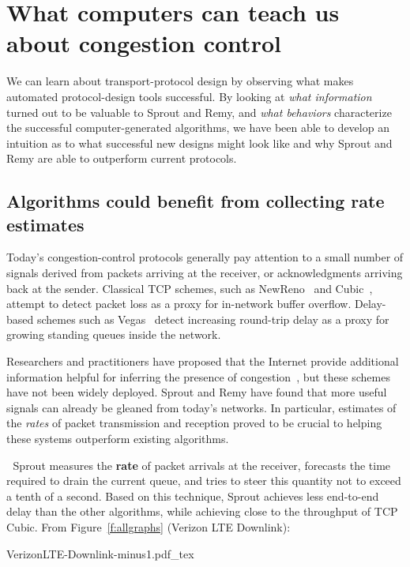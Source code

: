 \section{What computers can teach us about congestion control}

We can learn about transport-protocol design by observing what makes
automated protocol-design tools successful. By looking at \emph{what
  information} turned out to be valuable to Sprout and Remy, and
\emph{what behaviors} characterize the successful computer-generated
algorithms, we have been able to develop an intuition as to what
successful new designs might look like and why Sprout and Remy are
able to outperform current protocols.

\subsection{Algorithms could benefit from collecting rate estimates}

Today's congestion-control protocols generally pay attention to a
small number of signals derived from packets arriving at the receiver,
or acknowledgments arriving back at the sender. Classical TCP schemes,
such as NewReno~\cite{newreno} and Cubic~\cite{cubic}, attempt to
detect packet loss as a proxy for in-network buffer
overflow. Delay-based schemes such as Vegas~\cite{vegas} detect
increasing round-trip delay as a proxy for growing standing queues
inside the network.

Researchers and practitioners have proposed that the Internet provide
additional information helpful for inferring the presence of
congestion~\cite{ecn,xcp,rcp,vcp}, but these schemes have not been
widely deployed. Sprout and Remy have found that more useful signals
can already be gleaned from today's networks. In particular, estimates
of the \emph{rates} of packet transmission and reception proved to be
crucial to helping these systems outperform existing algorithms.

\noindent \begin{minipage}{\textwidth}

\textcolor{white}{.}\hspace{\parindent} Sprout measures the \textbf{rate} of packet arrivals at the receiver,
forecasts the time required to drain the current queue, and tries to
steer this quantity not to exceed a tenth of a second. Based on this
technique, Sprout achieves less end-to-end delay than the other
algorithms, while achieving close to the throughput of TCP
Cubic. From Figure~\ref{f:allgraphs} (Verizon LTE Downlink):

\vspace{\baselineskip}

\def\svgwidth{\textwidth}\footnotesize{VerizonLTE-Downlink-minus1.pdf_tex}
\end{minipage}

